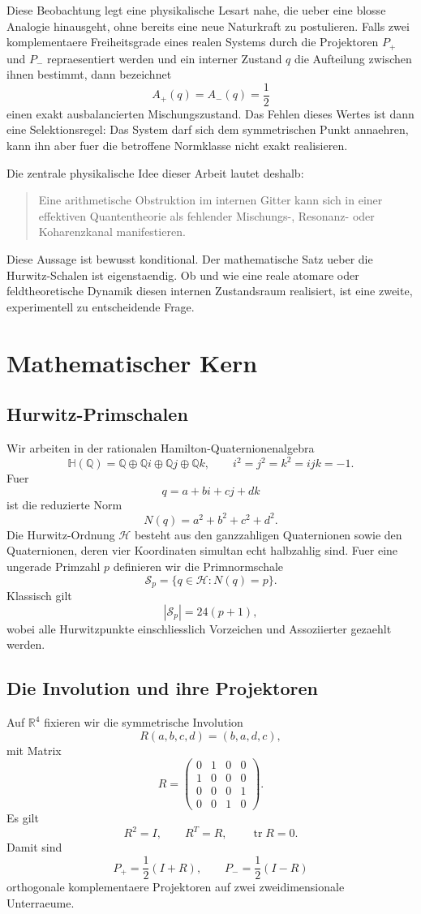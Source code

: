 \documentclass[11pt,a4paper]{article}
\theoremstyle{definition}
\newcommand{\QQ}{\mathbb Q}
\newcommand{\RR}{\mathbb R}
\newcommand{\tr}{\operatorname{tr}}
\begin{document}
Diese Beobachtung legt eine physikalische Lesart nahe, die ueber eine blosse Analogie hinausgeht, ohne bereits eine neue Naturkraft zu postulieren. Falls zwei komplementaere Freiheitsgrade eines realen Systems durch die Projektoren $P_+$ und $P_-$ repraesentiert werden und ein interner Zustand $q$ die Aufteilung zwischen ihnen bestimmt, dann bezeichnet
\[
A_+(q)=A_-(q)=\frac12
\]
einen exakt ausbalancierten Mischungszustand. Das Fehlen dieses Wertes ist dann eine Selektionsregel: Das System darf sich dem symmetrischen Punkt annaehren, kann ihn aber fuer die betroffene Normklasse nicht exakt realisieren.

Die zentrale physikalische Idee dieser Arbeit lautet deshalb:
\begin{quote}
Eine arithmetische Obstruktion im internen Gitter kann sich in einer effektiven Quantentheorie als fehlender Mischungs-, Resonanz- oder Koharenzkanal manifestieren.
\end{quote}

Diese Aussage ist bewusst konditional. Der mathematische Satz ueber die Hurwitz-Schalen ist eigenstaendig. Ob und wie eine reale atomare oder feldtheoretische Dynamik diesen internen Zustandsraum realisiert, ist eine zweite, experimentell zu entscheidende Frage.

\section{Mathematischer Kern}
\subsection{Hurwitz-Primschalen}
Wir arbeiten in der rationalen Hamilton-Quaternionenalgebra
\[
\mathbb H(\QQ)=\QQ\oplus\QQ i\oplus\QQ j\oplus\QQ k,
\qquad i^2=j^2=k^2=ijk=-1.
\]
Fuer
\[
q=a+bi+cj+dk
\]
ist die reduzierte Norm
\[
N(q)=a^2+b^2+c^2+d^2.
\]
Die Hurwitz-Ordnung $\mathcal H$ besteht aus den ganzzahligen Quaternionen sowie den Quaternionen, deren vier Koordinaten simultan echt halbzahlig sind. Fuer eine ungerade Primzahl $p$ definieren wir die Primnormschale
\[
\mathcal S_p=\{q\in\mathcal H:N(q)=p\}.
\]
Klassisch gilt
\[
|\mathcal S_p|=24(p+1),
\]
wobei alle Hurwitzpunkte einschliesslich Vorzeichen und Assoziierter gezaehlt werden.

\subsection{Die Involution und ihre Projektoren}
Auf $\RR^4$ fixieren wir die symmetrische Involution
\[
R(a,b,c,d)=(b,a,d,c),
\]
mit Matrix
\[
R=
\begin{pmatrix}
0&1&0&0\\
1&0&0&0\\
0&0&0&1\\
0&0&1&0
\end{pmatrix}.
\]
Es gilt
\[
R^2=I,\qquad R^T=R,\qquad \tr R=0.
\]
Damit sind
\[
P_+=\frac12(I+R),\qquad P_-=\frac12(I-R)
\]
orthogonale komplementaere Projektoren auf zwei zweidimensionale Unterraeume.
\end{document}
